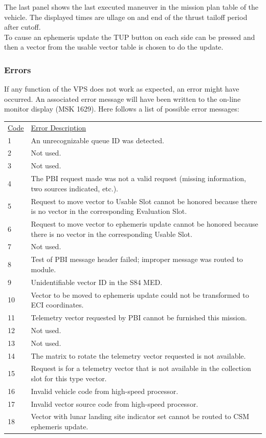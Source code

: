 \documentclass[11pt]{article} %
\begin{document}
The last panel shows the last executed maneuver in the mission plan table of the vehicle. The displayed times are ullage on and end of the thrust tailoff period after cutoff.\\

To cause an ephemeris update the TUP button on each side can be pressed and then a vector from the usable vector table is chosen to do the update.\\
\subsubsection{Errors}
If any function of the VPS does not work as expected, an error might have occurred. An associated error message will have been written to the on-line monitor display (MSK 1629). Here follows a list of possible error messages:\\

\begin{tabular}{p{3cm} p{10cm}}
\underline{Code}&\underline{Error Description}\\
1&An unrecognizable queue ID was detected.\\
2&Not used.\\
3&Not used.\\
4&The PBI request made was not a valid request (missing information, two sources indicated, etc.).\\
5&Request to move vector to Usable Slot cannot be honored because there is no vector in the corresponding Evaluation Slot.\\
6&Request to move vector to ephemeris update cannot be honored because there is no vector in the corresponding Usable Slot.\\
7&Not used.\\
8&Test of PBI message header failed; improper message was routed to module.\\
9&Unidentifiable vector ID in the S84 MED.\\
10&Vector to be moved to ephemeris update could not be transformed to ECI coordinates.\\
11&Telemetry vector requested by PBI cannot be furnished this mission.\\
12&Not used.\\
13&Not used.\\
14&The matrix to rotate the telemetry vector requested is not available.\\
15&Request is for a telemetry vector that is not available in the collection slot for this type vector.\\
16&Invalid vehicle code from high-speed processor.\\
17&Invalid vector source code from high-speed processor.\\
18&Vector with lunar landing site indicator set cannot be routed to CSM ephemeris update.\\
\end{tabular}
\newpage
\end{document}
